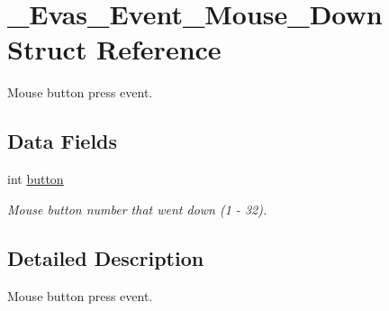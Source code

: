 \section{\_\-Evas\_\-Event\_\-Mouse\_\-Down Struct Reference}
\label{struct__Evas__Event__Mouse__Down}


Mouse button press event.  


\subsection*{Data Fields}
\begin{DoxyCompactItemize}
\item 
int \hyperlink{struct__Evas__Event__Mouse__Down_a0ab02808721d6c55fc642ecbb37d5ff9}{button}\label{struct__Evas__Event__Mouse__Down_a0ab02808721d6c55fc642ecbb37d5ff9}

\begin{DoxyCompactList}\small\item\em Mouse button number that went down (1 -\/ 32). \item\end{DoxyCompactList}\end{DoxyCompactItemize}


\subsection{Detailed Description}
Mouse button press event. 